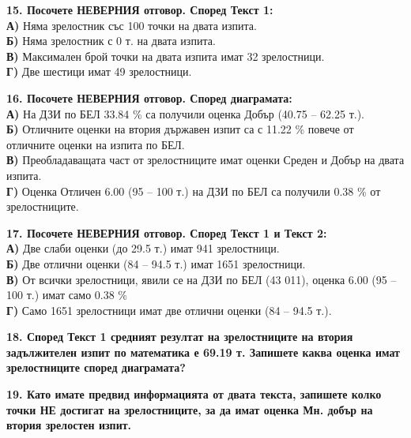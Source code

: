 \documentclass[12pt,a4paper]{article}
\begin{document}
\vspace{0.6cm}

\noindent
\textbf{15. Посочете НЕВЕРНИЯ отговор. Според Текст 1:} \\
\noindent
\textbf{А)} Няма зрелостник със 100 точки на двата изпита. \\
\textbf{Б)} Няма зрелостник с 0 т. на двата изпита. \\
\textbf{В)} Максимален брой точки на двата изпита имат 32 зрелостници. \\
\textbf{Г)} Две шестици имат 49 зрелостници.

\vspace{0.6cm}

\noindent
\textbf{16. Посочете НЕВЕРНИЯ отговор. Според диаграмата:} \\
\noindent
\textbf{А)} На ДЗИ по БЕЛ 33.84 \% са получили оценка Добър (40.75 -- 62.25 т.). \\
\textbf{Б)} Отличните оценки на втория държавен изпит са с 11.22 \% повече от отличните оценки на изпита по БЕЛ. \\
\textbf{В)} Преобладаващата част от зрелостниците имат оценки Среден и Добър на двата изпита. \\
\textbf{Г)} Оценка Отличен 6.00 (95 -- 100 т.) на ДЗИ по БЕЛ са получили 0.38 \% от зрелостниците.

\vspace{0.6cm}

\noindent
\textbf{17. Посочете НЕВЕРНИЯ отговор. Според Текст 1 и Текст 2:} \\
\noindent
\textbf{А)} Две слаби оценки (до 29.5 т.) имат 941 зрелостници. \\
\textbf{Б)} Две отлични оценки (84 -- 94.5 т.) имат 1651 зрелостници. \\
\textbf{В)} От всички зрелостници, явили се на ДЗИ по БЕЛ (43 011), оценка 6.00 (95 -- 100 т.) имат само 0.38 \% \\
\textbf{Г)} Само 1651 зрелостници имат две отлични оценки (84 -- 94.5 т.).

\vspace{0.6cm}

\noindent
\textbf{18. Според Текст 1 средният резултат на зрелостниците на втория задължителен изпит по математика е 69.19 т. Запишете каква оценка имат зрелостниците според диаграмата?}

\vspace{0.6cm}

\noindent
\textbf{19. Като имате предвид информацията от двата текста, запишете колко точки НЕ достигат на зрелостниците, за да имат оценка Мн. добър на втория зрелостен изпит.}
\end{document}

